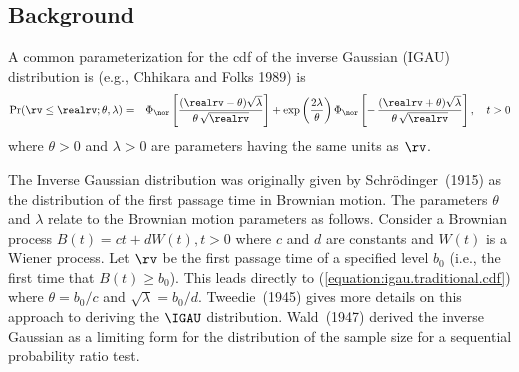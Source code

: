 \subsection{Background}
\label{section:igau.dist}
A common parameterization for the cdf of the inverse Gaussian (IGAU)
distribution is (e.g., Chhikara and Folks 1989) is
\begin{eqnarray}  
\label{equation:igau.traditional.cdf}
\Pr(\rv \le \realrv;\theta,\lambda) &=&
\Phi_{\nor}\left [\frac{(\realrv-\theta) \sqrt{\lambda}}
                       {\theta\, \sqrt{\realrv}}
\right ]+ 
\exp \left (
	\frac{2 \lambda}{ \theta}
     \right )
\Phi_{\nor}\left [-\, \frac{(\realrv+\theta) \sqrt{\lambda}}
                           {\theta\, \sqrt{\realrv}}
\right ], \quad t>0
 \end{eqnarray} 
where $\theta>0$ and $\lambda>0$ are parameters having the
same units as $\rv$. 

The Inverse Gaussian distribution was originally given by
Schr\"{o}dinger~(1915) as the distribution of the first passage time
in Brownian motion. The parameters $\theta$ and $\lambda$ relate to
the Brownian motion parameters as follows.  Consider a Brownian
process $B(t)=c t +d W(t), t>0$ where $c$ and $d$ are constants and $W(t)$
is a Wiener process. Let $\rv$ be the first passage time of a
specified level $b_{0}$ (i.e., the first time that $ B(t) \ge b_{0}
$).
This leads directly to 
(\ref{equation:igau.traditional.cdf})
where $\theta=b_{0}/c$ and $\sqrt{\lambda}=b_{0}/d$.
Tweedie~(1945) gives more details on this approach to deriving the
$\IGAU$ distribution. Wald~(1947)
derived the inverse Gaussian as a limiting form for the
distribution of the sample size for a sequential probability ratio
test.

